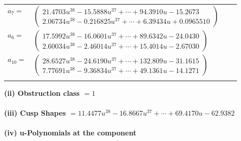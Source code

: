 \documentclass[1p]{elsarticle_modified}
\theoremstyle{definition}
\begin{document}
\begin{tabular}{m{7pt} m{180pt} m{7pt} m{180pt} }
\flushright $a_{7}=$&$\begin{pmatrix}21.4703 u^{38}-15.5888 u^{37}+\cdots+94.3910 u-15.2673\\2.06734 u^{38}-0.216825 u^{37}+\cdots+6.39434 u+0.0965510\end{pmatrix}$ \\
\flushright $a_{6}=$&$\begin{pmatrix}17.5992 u^{38}-16.0601 u^{37}+\cdots+89.6342 u-24.0430\\2.60034 u^{38}-2.46014 u^{37}+\cdots+15.4014 u-2.67030\end{pmatrix}$ \\
\flushright $a_{10}=$&$\begin{pmatrix}28.6527 u^{38}-24.6190 u^{37}+\cdots+132.809 u-31.1615\\7.77691 u^{38}-9.36834 u^{37}+\cdots+49.1361 u-14.1271\end{pmatrix}$\\&\end{tabular}
\flushleft \textbf{(ii) Obstruction class $= 1$}\\~\\
\flushleft \textbf{(iii) Cusp Shapes $= 11.4477 u^{38}-16.8667 u^{37}+\cdots+69.4170 u-62.9382$}\\~\\
\newpage\renewcommand{\arraystretch}{1}
\flushleft \textbf{(iv) u-Polynomials at the component}\newline \\
\end{document}
